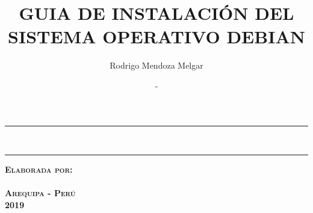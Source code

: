 \documentclass[12pt,twoside]{report}
\title{GUIA DE INSTALACIÓN DEL SISTEMA OPERATIVO DEBIAN}\let\Title\@title
\author{Rodrigo Mendoza Melgar}\let\Author\@author
\date{-}\let\Date\@date
\begin{document}
\begin{titlepage}
\begin{center}

\vspace*{6em}

\rule{\textwidth}{1.6pt}
\LARGE \textbf{ \Title }\\
\rule{\textwidth}{1.6pt}

\vspace*{6em}

\textsc{\textbf{Elaborada por:}}\\
\textsc{\textbf{\Author}}\\[15em]
\textsc{\textbf{Arequipa - Perú}}\\
\textsc{\textbf{2019}}\\[1em]
\end{center}
\end{titlepage}

\tableofcontents

\pagestyle{fancy}




\end{document}
